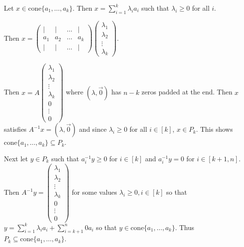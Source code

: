 \documentclass[11pt]{article}
\newcommand{\setR}{\mathbb{R}}
\renewcommand{\geq}{\geqslant}
\newcommand{\cone}{\mathrm{cone}}
\begin{document}
\begin{enumerate}[1)]
  
  \begin{solution}
  Let $x \in \cone\{a_1, \hdots, a_k\}$. Then $x = \displaystyle\sum_{i =1}^k \lambda_i a_i$ such that $\lambda_i \geq 0$ for all $i$. 
  
  
  Then $x = \begin{pmatrix}|&|&\hdots &|\\a_1 & a_2 & \hdots & a_k \\ |&|&\hdots &|\end{pmatrix} \begin{pmatrix}\lambda_1 \\ \lambda_2 \\ \vdots \\ \lambda_k\end{pmatrix}$.
  
  Then $x = A \begin{pmatrix} \lambda_1 \\ \lambda_2 \\ \vdots \\ \lambda_k \\ 0 \\ \vdots \\ 0\end{pmatrix}$ where $(\lambda, \vec{0})$ has $n-k$ zeros padded at the end. Then $x$ satisfies $A^{-1}x = (\lambda,  \vec{0})$ and since $\lambda_i \geq 0$ for all $i \in [k]$, $ x \in P_k$. This shows $\cone\{a_1, \hdots, a_k\} \subseteq P_k$. 
  
  Next let $y \in P_k$ such that $a_i^{-1}y \geq 0$ for $i \in [k]$ and $a^{-1}_i y = 0$ for $i \in [k+1, n]$. Then $A^{-1}y = \begin{pmatrix} \lambda_1 \\ \lambda_2 \\ \vdots \\ \lambda_k \\ 0 \\ \vdots \\ 0\end{pmatrix}$ for some values $\lambda_i \geq 0, i \in [k]$ so that $y = \displaystyle\sum_{i =1}^k \lambda_i a_i + \displaystyle\sum_{i =k+1}^n 0 a_i$ so that $y \in \cone\{a_1, \hdots, a_k\}$. Thus $P_k \subseteq \cone\{a_1, \hdots, a_k\}$. 
  
  
  
  \end{solution}
  
  
  
  
  

\end{enumerate}
\end{document}
